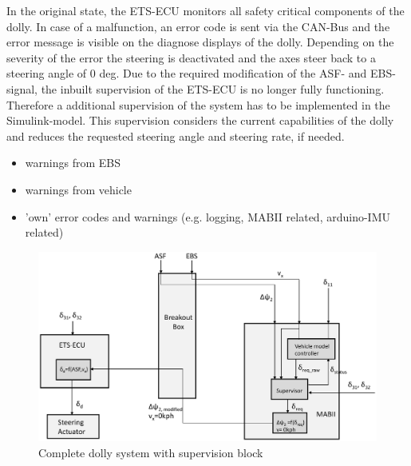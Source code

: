 \documentclass[ExampleMasters.tex]{subfiles}
\begin{document}
In the original state, the \gls{ETS}-\gls{ECU} monitors all safety critical components of the dolly. In case of a malfunction, an error code is sent via the \gls{CAN}-Bus and the error message is visible on the diagnose displays of the dolly. Depending on the severity of the error the steering is deactivated and the axes steer back to a steering angle of 0 deg.
Due to the required modification of the \gls{ASF}- and \gls{EBS}-signal, the inbuilt supervision of the \gls{ETS}-\gls{ECU} is no longer fully functioning. Therefore a additional supervision of the system has to be implemented in the Simulink-model. This supervision considers the current capabilities of the dolly and reduces the requested steering angle and steering rate, if needed. 
\begin{itemize}   
	\item warnings from \gls{EBS}
	\item warnings from vehicle
	\item 'own' error codes and warnings (e.g. logging, \gls{MABII} related, arduino-\gls{IMU} related)
\end{itemize}

\begin{figure}[!htb]
	\centering
	\includegraphics[width=1\linewidth]{figures/system_mod}
	\caption{Complete dolly system with supervision block}
	\label{fig:system_modification}
\end{figure}
\end{document}
